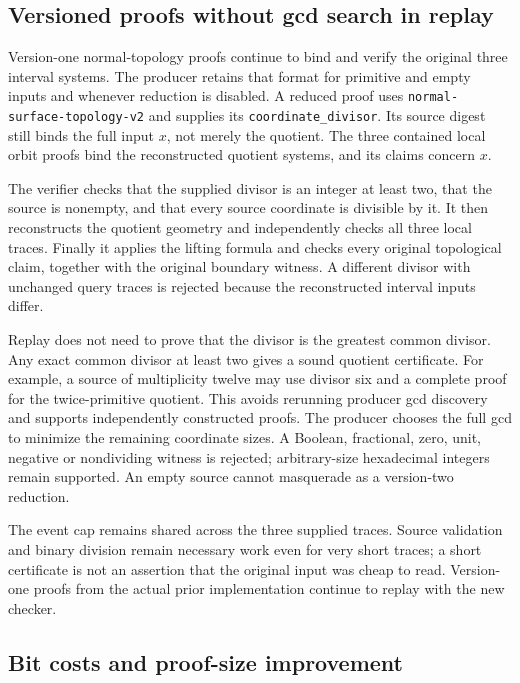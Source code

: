 \subsection{Versioned proofs without gcd search in replay}

Version-one normal-topology proofs continue to bind and verify the original
three interval systems. The producer retains that format for primitive and
empty inputs and whenever reduction is disabled. A reduced proof uses
\texttt{normal-surface-topology-v2} and supplies its
\texttt{coordinate\_divisor}. Its source digest still binds the full input
$x$, not merely the quotient. The three contained local orbit proofs bind
the reconstructed quotient systems, and its claims concern $x$.

The verifier checks that the supplied divisor is an integer at least two,
that the source is nonempty, and that every source coordinate is divisible
by it. It then reconstructs the quotient geometry and independently checks
all three local traces. Finally it applies the lifting formula and checks
every original topological claim, together with the original boundary
witness. A different divisor with unchanged query traces is rejected
because the reconstructed interval inputs differ.

Replay does not need to prove that the divisor is the greatest common
divisor. Any exact common divisor at least two gives a sound quotient
certificate. For example, a source of multiplicity twelve may use divisor
six and a complete proof for the twice-primitive quotient. This avoids
rerunning producer gcd discovery and supports independently constructed
proofs. The producer chooses the full gcd to minimize the remaining
coordinate sizes. A Boolean, fractional, zero, unit, negative or
nondividing witness is rejected; arbitrary-size hexadecimal integers remain
supported. An empty source cannot masquerade as a version-two reduction.

The event cap remains shared across the three supplied traces. Source
validation and binary division remain necessary work even for very short
traces; a short certificate is not an assertion that the original input
was cheap to read. Version-one proofs from the actual prior implementation
continue to replay with the new checker.

\subsection{Bit costs and proof-size improvement}

